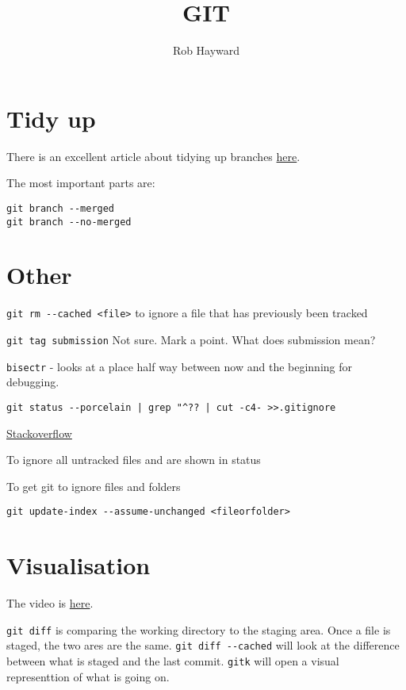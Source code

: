 \documentclass[11pt]{article} %
\title{GIT}
\author{Rob Hayward}
\begin{document}
\maketitle

\section*{Tidy up}
There is an excellent article about tidying up branches \href{http://railsware.com/blog/2014/08/11/git-housekeeping-tutorial-clean-up-outdated-branches-in-local-and-remote-repositories/}{here}. 

The most important parts are:
\begin{lstlisting}
git branch --merged
git branch --no-merged
\end{lstlisting}

\section*{Other}

\lstinline{git rm --cached <file>}  to ignore a file that has previously been tracked

\lstinline{git tag submission}  Not sure.  Mark a point. What does submission mean? 

\lstinline{bisectr} - looks at a place half way between now and the beginning for debugging.

\lstinline{git status --porcelain | grep "^?? | cut -c4- >>.gitignore}

\href{http://stackoverflow.com/questions/11542687/git-how-to-ignore-all-present-untracked-files}{Stackoverflow}

To ignore all untracked files and are shown in status

To get git to ignore files and folders

\lstinline{git update-index --assume-unchanged <fileorfolder>}

\section{Visualisation}
The video is \href{https://www.youtube.com/watch?v=sGORc1eOVyE&feature=em-subs_digest}{here}. 

\lstinline{git diff} is comparing the working directory to the staging area. Once a file is staged, the two ares are the same. \lstinline{git diff --cached} will look at the difference between what is staged and the last commit. \lstinline{gitk} will open a visual representtion of what  is going on.  
\end{document}
